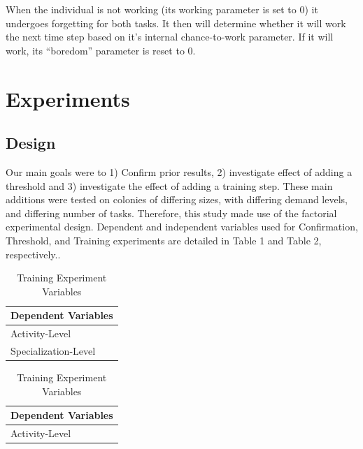 \documentclass[a4paper]{article}
\begin{document}
When the individual is not working (its working parameter is set to 0) it undergoes forgetting for both tasks. It then will determine whether it will work the next time step based on it’s internal chance-to-work parameter. If it will work, its “boredom” parameter is reset to 0. 



\section{Experiments}

\subsection{Design}

Our main goals were to 1) Confirm prior results, 2) investigate effect of adding a threshold and 3) investigate the effect of adding a training step. These main additions were tested on colonies of differing sizes, with differing demand levels, and differing number of tasks. Therefore, this study made use of the factorial experimental design. Dependent and independent variables used for Confirmation, Threshold, and Training experiments are detailed in Table 1 and Table 2, respectively.. \\



\begin{table}
\caption{Independent Variables}\label{table:1}
\begin{subtable}[t]{3in}
\centering
  \begin{tabular}{ | l | }
    \hline
     \textbf{Dependent Variables} \\ \hline
    Activity-Level \\ \hline
    Specialization-Level \\
    \hline
  \end{tabular}
  \caption{Confirmation and Threshold Experiment Variables}\label{table:1a}
 \end {subtable}
\quad
\begin{subtable}[t]{3in}
\centering
\begin{tabular}{ | l |}
    \hline
     \textbf{Dependent Variables}  \\ \hline
    Activity-Level \\ 
    \hline
  \end{tabular}
  \caption{Training Experiment Variables}\label{table:1b}
\end {subtable}
\end{table}
\end{document}

